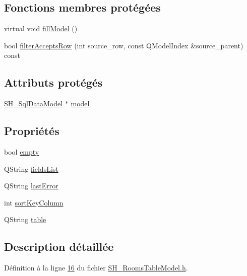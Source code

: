 \subsection*{Fonctions membres protégées}
\begin{DoxyCompactItemize}
\item 
virtual void \hyperlink{classSH__RoomsTableModel_ac11a4147485348d4504a8508e6bb5398}{fill\-Model} ()
\item 
bool \hyperlink{classSH__ExtendedProxyModel_a5c9a68f10afb83af24896beac56e0ae3}{filter\-Accepts\-Row} (int source\-\_\-row, const Q\-Model\-Index \&source\-\_\-parent) const 
\end{DoxyCompactItemize}
\subsection*{Attributs protégés}
\begin{DoxyCompactItemize}
\item 
\hyperlink{classSH__SqlDataModel}{S\-H\-\_\-\-Sql\-Data\-Model} $\ast$ \hyperlink{classSH__ExtendedProxyModel_a8c8b8930c6b1abd9bbb1dce1fdc9690b}{model}
\end{DoxyCompactItemize}
\subsection*{Propriétés}
\begin{DoxyCompactItemize}
\item 
bool \hyperlink{classSH__ExtendedProxyModel_a9e22d17af7776aca8052084cc33c3442}{empty}
\item 
Q\-String \hyperlink{classSH__ExtendedProxyModel_a15e779ba92384a57442d6bd79ef3d1d1}{fields\-List}
\item 
Q\-String \hyperlink{classSH__ExtendedProxyModel_a1597853dfae8c3972ef3396293d5d0fc}{last\-Error}
\item 
int \hyperlink{classSH__ExtendedProxyModel_a47e2d0b99b84fb066438db667dd1ad26}{sort\-Key\-Column}
\item 
Q\-String \hyperlink{classSH__ExtendedProxyModel_a7eef4557a77444e9ce5c24c180392bfa}{table}
\end{DoxyCompactItemize}


\subsection{Description détaillée}


Définition à la ligne \hyperlink{SH__RoomsTableModel_8h_source_l00016}{16} du fichier \hyperlink{SH__RoomsTableModel_8h_source}{S\-H\-\_\-\-Rooms\-Table\-Model.\-h}.



